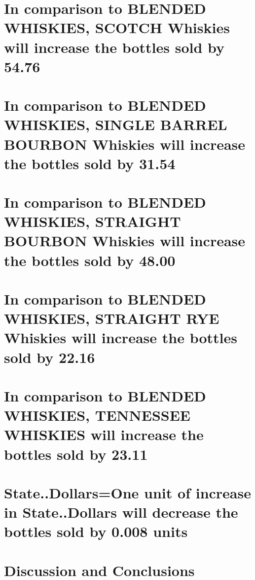 \documentclass[]{elsarticle} %
\begin{document}
\section{In comparison to BLENDED WHISKIES, SCOTCH Whiskies will
increase the bottles sold by
54.76}\label{in-comparison-to-blended-whiskies-scotch-whiskies-will-increase-the-bottles-sold-by-54.76}

\section{In comparison to BLENDED WHISKIES, SINGLE BARREL BOURBON
Whiskies will increase the bottles sold by
31.54}\label{in-comparison-to-blended-whiskies-single-barrel-bourbon-whiskies-will-increase-the-bottles-sold-by-31.54}

\section{In comparison to BLENDED WHISKIES, STRAIGHT BOURBON Whiskies
will increase the bottles sold by
48.00}\label{in-comparison-to-blended-whiskies-straight-bourbon-whiskies-will-increase-the-bottles-sold-by-48.00}

\section{In comparison to BLENDED WHISKIES, STRAIGHT RYE Whiskies will
increase the bottles sold by
22.16}\label{in-comparison-to-blended-whiskies-straight-rye-whiskies-will-increase-the-bottles-sold-by-22.16}

\section{In comparison to BLENDED WHISKIES, TENNESSEE WHISKIES will
increase the bottles sold by
23.11}\label{in-comparison-to-blended-whiskies-tennessee-whiskies-will-increase-the-bottles-sold-by-23.11}

\section{State..Dollars=One unit of increase in State..Dollars will
decrease the bottles sold by 0.008
units}\label{state..dollarsone-unit-of-increase-in-state..dollars-will-decrease-the-bottles-sold-by-0.008-units}

\section{Discussion and Conclusions}\label{discussion-and-conclusions}
\end{document}

